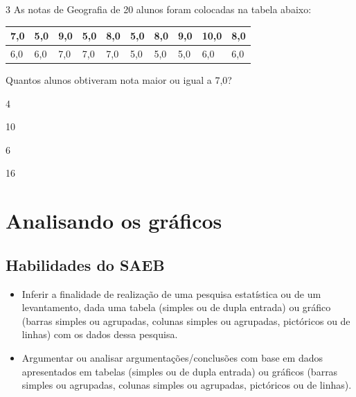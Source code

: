 \num{3} As notas de Geografia de 20 alunos foram colocadas na tabela
abaixo:

\begin{longtable}[]{@{}llllllllll@{}}
\toprule
7,0 & 5,0 & 9,0 & 5,0 & 8,0 & 5,0 & 8,0 & 9,0 & 10,0 &
8,0\tabularnewline
\midrule
\endhead
6,0 & 6,0 & 7,0 & 7,0 & 7,0 & 5,0 & 5,0 & 5,0 & 6,0 & 6,0\tabularnewline
\bottomrule
\end{longtable}

Quantos alunos obtiveram nota maior ou igual a 7,0?

\begin{minipage}{.5\textwidth}
\begin{escolha}
\item
  4
\item
  10
\item
  6
\item
  16
\end{escolha}
\end{minipage}

\chapter{Analisando os gráficos}

\section{Habilidades do SAEB}

\begin{itemize}
\item Inferir a finalidade de realização de uma pesquisa estatística ou de
um levantamento, dada uma tabela (simples ou de dupla entrada) ou
gráfico (barras simples ou agrupadas, colunas simples ou agrupadas,
pictóricos ou de linhas) com os dados dessa pesquisa.

\item Argumentar ou analisar argumentações/conclusões com base em dados
apresentados em tabelas (simples ou de dupla entrada) ou gráficos
(barras simples ou agrupadas, colunas simples ou agrupadas, pictóricos
ou de linhas).
\end{itemize}

